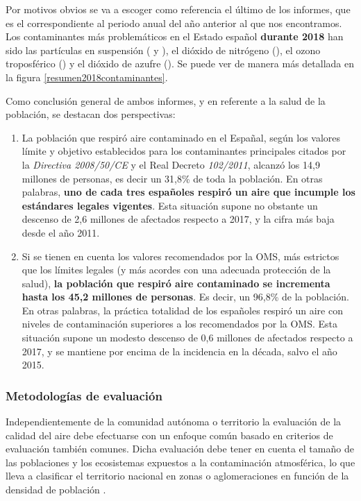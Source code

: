  
 Por motivos obvios se va a escoger como referencia el último de los informes, que es el correspondiente al periodo anual del año anterior al que nos encontramos. Los contaminantes más problemáticos en el Estado español \textbf{durante 2018} han sido las partículas en suspensión ( y ), el dióxido de nitrógeno (), el ozono troposférico () y el dióxido de azufre (). Se puede ver de manera más detallada en la figura \ref{resumen2018contaminantes}.

 
Como conclusión general de ambos informes, y en referente a la salud de la población, se destacan dos perspectivas:
\begin{enumerate}
	\item La población que respiró aire contaminado en el Españal, según los valores límite y objetivo establecidos para los contaminantes principales citados por la \textit{Directiva 2008/50/CE} y el Real Decreto \textit{102/2011}, alcanzó los 14,9 millones de personas, es decir un 31,8\% de toda la población. En otras palabras, \textbf{uno de cada tres españoles respiró un aire que incumple los estándares legales vigentes}. Esta situación supone no obstante un descenso de 2,6 millones de afectados respecto a 2017, y la cifra más baja desde el año 2011.
	\item Si se tienen en cuenta los valores recomendados por la OMS, más estrictos que los límites legales (y más acordes con una adecuada protección	de la salud), \textbf{la población que respiró aire contaminado se incrementa hasta los 45,2 millones de personas}. Es decir, un 96,8\% de la población. En otras palabras, la práctica totalidad de los españoles respiró un aire con niveles de contaminación superiores a los recomendados por la OMS. Esta situación supone un modesto descenso de 0,6 millones de afectados respecto a 2017, y se mantiene por encima de la incidencia en la década, salvo el año 2015.
\end{enumerate}

\subsubsection{Metodologías de evaluación}

Independientemente de la comunidad autónoma o territorio  la evaluación de la calidad del aire debe efectuarse con un enfoque común basado en criterios de evaluación también comunes. Dicha evaluación debe tener en cuenta el tamaño de las poblaciones y los ecosistemas expuestos a la contaminación atmosférica, lo que lleva a clasificar el territorio nacional en zonas o aglomeraciones en función de la densidad de población \cite{casado_reinaldos_big_2018}.

